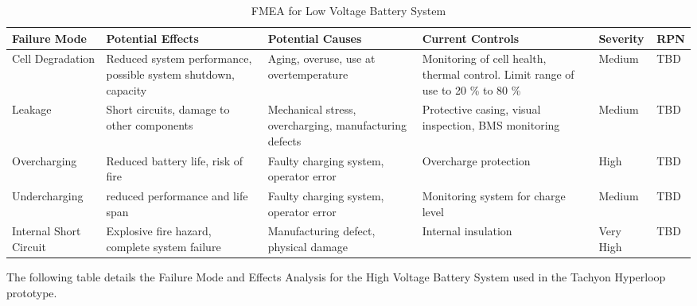 \begin{table}[ht]
\centering
\begin{tabular}{>{\raggedright}p{2cm} >{\raggedright}p{2.5cm} >{\raggedright}p{2.5cm} >{\raggedright}p{2cm} >{\raggedright}p{1.5cm} >{\raggedright\arraybackslash}p{1.5cm}}
\toprule
\textbf{Failure Mode} & \textbf{Potential Effects} & \textbf{Potential Causes} & \textbf{Current Controls} & \textbf{Severity} & \textbf{RPN} \\
\midrule
Cell Degradation & Reduced system performance, possible system shutdown, capacity & Aging, overuse, use at overtemperature & Monitoring of cell health, thermal control. Limit range of use to 20 \% to 80 \% & Medium &  TBD\\
\addlinespace
Leakage & Short circuits, damage to other components & Mechanical stress, overcharging, manufacturing defects & Protective casing, visual inspection, BMS monitoring & Medium & TBD \\
\addlinespace
Overcharging & Reduced battery life, risk of fire & Faulty charging system, operator error & Overcharge protection & High & TBD \\
\addlinespace
Undercharging & reduced performance and life span & Faulty charging system, operator error & Monitoring system for charge level & Medium & TBD \\
\addlinespace
Internal Short Circuit & Explosive fire hazard, complete system failure & Manufacturing defect, physical damage & Internal insulation & Very High & TBD \\
\bottomrule
\end{tabular}
\caption{FMEA for Low Voltage Battery System}
\end{table}

The following table details the Failure Mode and Effects Analysis for the High Voltage Battery System used in the Tachyon Hyperloop prototype.

